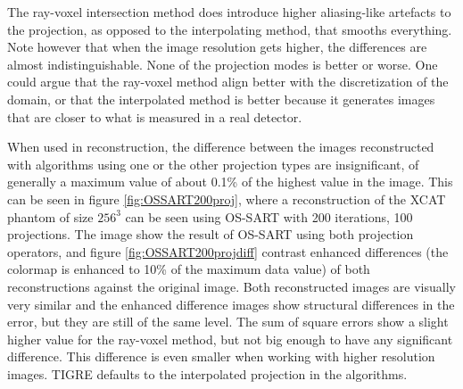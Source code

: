 The ray-voxel intersection method does introduce higher aliasing-like artefacts to the projection, as opposed to the interpolating method, that smooths everything. Note however that when the image resolution gets higher, the differences are almost indistinguishable. None of the projection modes is better or worse. One could argue that the ray-voxel method align better with the discretization of the domain, or that the interpolated method is better because it generates images that are closer to what is measured in a real detector. 


When used in reconstruction, the difference between the images reconstructed with algorithms using one or the other projection types are insignificant, of generally a maximum value of about 0.1\% of the highest value in the image. This can be seen in figure \ref{fig:OSSART200proj}, where a reconstruction of the XCAT\cite{XCAT} phantom of size $256^3$ can be seen using OS-SART with 200 iterations, 100 projections. The image show the result of OS-SART using both projection operators, and figure \ref{fig:OSSART200projdiff} contrast enhanced differences (the colormap is enhanced to 10\% of the maximum data value) of both reconstructions against the original image. Both reconstructed images are visually very similar and the enhanced difference images show structural differences in the error, but they are still of the same level. The sum of square errors show a slight higher value for the ray-voxel method, but not big enough to have any significant difference. This difference is even smaller when working with higher resolution images. TIGRE defaults to the interpolated projection in the algorithms.



